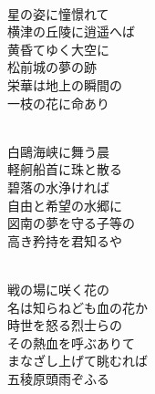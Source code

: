 \documentclass[10pt,b5j]{tarticle} %
\begin{document}
\vspace{1.5em} %
\newcommand{\linespace}{0.5em} %
\newcommand{\blocksize}{0.5\hsize} %
\newcommand{\itemmargin}{3em} %
\begin{enumerate} %
    \setlength{\itemindent}{\itemmargin} %
    \begin{minipage}[c]{\blocksize}
    
        \vspace{\linespace}
        \item~\\
        星の姿に憧憬れて\\
        横津の丘陵に逍遥へば\\
        黄昏てゆく大空に\\
        松前城の夢の跡\\
        栄華は地上の瞬間の\\
        一枝の花に命あり
        
    \end{minipage}
    \begin{minipage}[c]{\blocksize}
        
        \vspace{\linespace}
        \item~\\
        白鷗海峡に舞う晨\\
        軽舸船首に珠と散る\\
        碧落の水浄ければ\\
        自由と希望の水郷に\\
        図南の夢を守る子等の\\
        高き矜持を君知るや
        
    \end{minipage}
    \begin{minipage}[c]{\blocksize}
        
        \vspace{\linespace}
        \item~\\
        戦の場に咲く花の\\
        名は知らねども血の花か\\
        時世を怒る烈士らの\\
        その熱血を呼ぶありて\\
        まなざし上げて眺むれば\\
        五稜原頭雨ぞふる
    
    \end{minipage}
\end{enumerate} %
\end{document}
